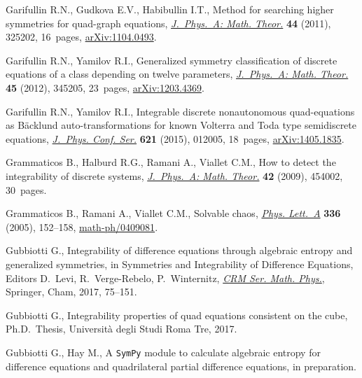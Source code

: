 \documentclass[pdftex]{sigma}
\numberwithin{equation}{section}
\begin{document}
\begin{thebibliography}{99}
Garifullin R.N., Gudkova E.V., Habibullin I.T., Method for searching higher
 symmetries for quad-graph equations, \href{https://doi.org/10.1088/1751-8113/44/32/325202}{\textit{J.~Phys.~A: Math. Theor.}}
 \textbf{44} (2011), 325202, 16~pages, \href{https://arxiv.org/abs/1104.0493}{arXiv:1104.0493}.

Garifullin R.N., Yamilov R.I., Generalized symmetry classif\/ication of discrete
 equations of a class depending on twelve parameters, \href{https://doi.org/10.1088/1751-8113/45/34/345205}{\textit{J.~Phys.~A:
 Math. Theor.}} \textbf{45} (2012), 345205, 23~pages, \href{https://arxiv.org/abs/1203.4369}{arXiv:1203.4369}.

Garifullin R.N., Yamilov R.I., Integrable discrete nonautonomous quad-equations
 as {B}\"acklund auto-transformations for known {V}olterra and {T}oda type
 semidiscrete equations, \href{https://doi.org/10.1088/1742-6596/621/1/012005}{\textit{J.~Phys. Conf. Ser.}} \textbf{621} (2015),
 012005, 18~pages, \href{https://arxiv.org/abs/1405.1835}{arXiv:1405.1835}.

Grammaticos B., Halburd R.G., Ramani A., Viallet C.M., How to detect the
 integrability of discrete systems, \href{https://doi.org/10.1088/1751-8113/42/45/454002}{\textit{J.~Phys.~A: Math. Theor.}}
 \textbf{42} (2009), 454002, 30~pages.

Grammaticos B., Ramani A., Viallet C.M., Solvable chaos, \href{https://doi.org/10.1016/j.physleta.2005.01.026}{\textit{Phys. Lett.~A}}
 \textbf{336} (2005), 152--158, \mbox{\href{https://arxiv.org/abs/math-ph/0409081}{math-ph/0409081}}.

Gubbiotti G., Integrability of dif\/ference equations through algebraic entropy
 and generalized symmetries, in Symmetries and Integrability of Dif\/ference
 Equations, Editors D.~Levi, R.~Verge-Rebelo, P.~Winternitz, \href{https://doi.org/10.1007/978-3-319-56666-5_3}{\textit{CRM Ser. Math.
 Phys.}}, Springer, Cham, 2017, 75--151.

Gubbiotti G., Integrability properties of quad equations consistent on the
 cube, Ph.D.~Thesis, Universit\`a degli Studi Roma Tre, 2017.

Gubbiotti G., Hay M., A \texttt{SymPy} module to calculate algebraic entropy
 for dif\/ference equations and quadrilateral partial dif\/ference equations, in
 preparation.


\end{thebibliography}
\end{document}
